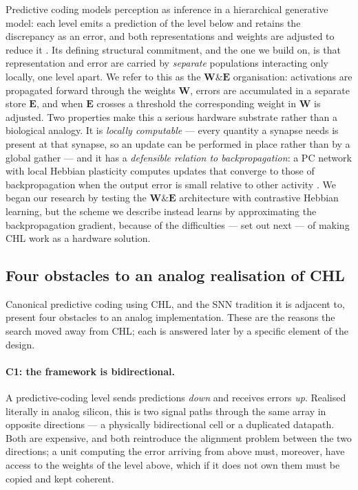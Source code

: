 \documentclass[11pt]{article}
\begin{document}
Predictive coding models perception as inference in a hierarchical
generative model: each level emits a prediction of the level below and
retains the discrepancy as an error, and both representations and
weights are adjusted to reduce it
\cite{rao1999predictive, bogacz2017tutorial}. Its defining structural
commitment, and the one we build on, is that representation and error
are carried by \emph{separate} populations interacting only locally, one
level apart. We refer to this as the \(\bm W\&\bm E\) organisation:
activations are propagated forward through the weights \(\bm W\), errors
are accumulated in a separate store \(\bm E\), and when \(\bm E\)
crosses a threshold the corresponding weight in \(\bm W\) is adjusted.
Two properties make this a serious hardware substrate rather than a
biological analogy. It is \emph{locally computable} --- every quantity a
synapse needs is present at that synapse, so an update can be performed
in place rather than by a global gather --- and it has a
\emph{defensible relation to backpropagation}: a PC network with local
Hebbian plasticity computes updates that converge to those of
backpropagation when the output error is small relative to other
activity \cite{whittington2017approximation}. We began our research by
testing the \(\bm W\&\bm E\) architecture with contrastive Hebbian
learning, but the scheme we describe instead learns by approximating the
backpropagation gradient, because of the difficulties --- set out next
--- of making CHL work as a hardware solution.

\hypertarget{sec:pc-challenges}{%
\subsection{Four obstacles to an analog realisation of
CHL}\label{sec:pc-challenges}}

Canonical predictive coding using CHL, and the SNN tradition it is
adjacent to, present four obstacles to an analog implementation. These
are the reasons the search moved away from CHL; each is answered later
by a specific element of the design.

\hypertarget{c1-the-framework-is-bidirectional.}{%
\paragraph{C1: the framework is
bidirectional.}\label{c1-the-framework-is-bidirectional.}}

A predictive-coding level sends predictions \emph{down} and receives
errors \emph{up}. Realised literally in analog silicon, this is two
signal paths through the same array in opposite directions --- a
physically bidirectional cell or a duplicated datapath. Both are
expensive, and both reintroduce the alignment problem between the two
directions; a unit computing the error arriving from above must,
moreover, have access to the weights of the level above, which if it
does not own them must be copied and kept coherent.
\end{document}
